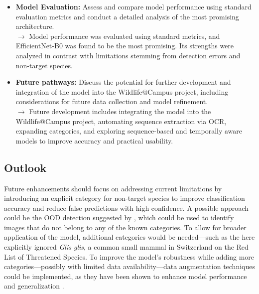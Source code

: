 \begin{itemize}
    \item \textbf{Model Evaluation:} Assess and compare model performance using standard evaluation metrics and conduct a detailed analysis of the most promising architecture.\\
    $\rightarrow$ Model performance was evaluated using standard metrics, and EfficientNet-B0 was found to be the most promising. Its strengths were analyzed in contrast with limitations stemming from detection errors and non-target species.

    \item \textbf{Future pathways:} Discuss the potential for further development and integration of the model into the Wildlife@Campus project, including considerations for future data collection and model refinement.\\
    $\rightarrow$ Future development includes integrating the model into the Wildlife@Campus project, automating sequence extraction via OCR, expanding categories, and exploring sequence-based and temporally aware models to improve accuracy and practical usability.
\end{itemize}


\subsection{Outlook}
Future enhancements should focus on addressing current limitations by introducing an explicit category for non-target species to improve classification accuracy and reduce false predictions with high confidence.
A possible approach could be the \ac{OOD} detection suggested by \textcite{hendrycksBaselineDetectingMisclassified2018}, which could be used to identify images that do not belong to any of the known categories.
To allow for broader application of the model, additional categories would be needed---such as the here explicitly ignored \textit{Glis glis}, a common small mammal in Switzerland on the \textcite{iucnIUCNRedList2025} Red List of Threatened Species.
To improve the model's robustness while adding more categories---possibly with limited data availability---data augmentation techniques could be implemented, as they have been shown to enhance model performance and generalization \autocite{shortenSurveyImageData2019}.

